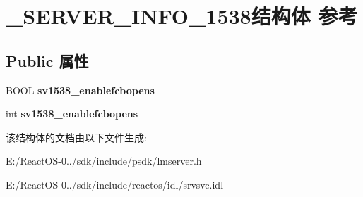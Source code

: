 \hypertarget{struct___s_e_r_v_e_r___i_n_f_o__1538}{}\section{\+\_\+\+S\+E\+R\+V\+E\+R\+\_\+\+I\+N\+F\+O\+\_\+1538结构体 参考}
\label{struct___s_e_r_v_e_r___i_n_f_o__1538}
\subsection*{Public 属性}
\begin{DoxyCompactItemize}
\item 
\mbox{\label{struct___s_e_r_v_e_r___i_n_f_o__1538_ac38d1275f2aea57ff0defaf12d593aa5}} 
B\+O\+OL {\bfseries sv1538\+\_\+enablefcbopens}
\item 
\mbox{\label{struct___s_e_r_v_e_r___i_n_f_o__1538_ae09fc5c480f8629d2d888f7229a77311}} 
int {\bfseries sv1538\+\_\+enablefcbopens}
\end{DoxyCompactItemize}


该结构体的文档由以下文件生成\+:\begin{DoxyCompactItemize}
\item 
E\+:/\+React\+O\+S-\/0../sdk/include/psdk/lmserver.\+h\item 
E\+:/\+React\+O\+S-\/0../sdk/include/reactos/idl/srvsvc.\+idl\end{DoxyCompactItemize}
